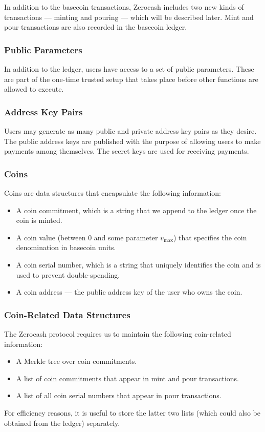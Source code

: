 \documentclass{article}
\begin{document}
In addition to the basecoin transactions, Zerocash includes two new kinds of transactions --- minting and pouring --- which will be described later. Mint and pour transactions are also recorded in the basecoin ledger.

\subsubsection{Public Parameters}
In addition to the ledger, users have access to a set of public parameters. These are part of the one-time trusted setup that takes place before other functions are allowed to execute.

\subsubsection{Address Key Pairs}
Users may generate as many public and private address key pairs as they desire. The public address keys are published with the purpose of allowing users to make payments among themselves. The secret keys are used for receiving payments.

\subsubsection{Coins}
Coins are data structures that encapsulate the following information:
\begin{itemize}
\item A coin commitment, which is a string that we append to the ledger once the coin is minted.
\item A coin value (between 0 and some parameter $v_{\text{max}}$) that specifies the coin denomination in basecoin units.
\item A coin serial number, which is a string that uniquely identifies the coin and is used to prevent double-spending.
\item A coin address --- the public address key of the user who owns the coin.
\end{itemize}

\subsubsection{Coin-Related Data Structures}
The Zerocash protocol requires us to maintain the following coin-related information:
\begin{itemize}
\item A Merkle tree over coin commitments.
\item A list of coin commitments that appear in mint and pour transactions.
\item A list of all coin serial numbers that appear in pour transactions.
\end{itemize}
For efficiency reasons, it is useful to store the latter two lists (which could also be obtained from the ledger) separately.
\end{document}
